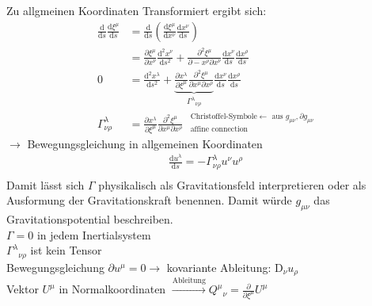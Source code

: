 \documentclass[a4paper]{article}
\begin{document}
Zu allgmeinen Koordinaten Transformiert ergibt sich:
\begin{align}
\frac{\mathrm{d}}{\mathrm{d}s}\frac{\mathrm{d}\xi^\mu}{\mathrm{d}s}&=
\frac{\mathrm{d}}{\mathrm{d}s}\left( \frac{\mathrm{d}\xi^\mu}{\mathrm{d}x^\nu}
\frac{\mathrm{d}x^\nu}{\mathrm{d}s} \right)\\
&=\frac{\partial \xi^\mu}{\partial x^\nu}
\frac{\mathrm{d}^2x^\nu}{\mathrm{d}s^2}+\frac{\partial^2 \xi^\mu}{\partial-
x^\rho \partial x^\nu}
\frac{\mathrm{d}x^\nu}{\mathrm{d}s} \frac{\mathrm{d}x^\rho}{\mathrm{d}s}\\
0&=\frac{\mathrm{d}^2x^\lambda}{\mathrm{d}s^2}+\underbrace{\frac{\partial
x^\lambda}{\partial \xi^\mu}\frac{\partial^2 \xi^\mu}{\partial x^\mu
\partial x^\rho}}_{\Gamma^\lambda{}_{\nu\rho}}
\frac{\mathrm{d}x^\nu}{\mathrm{d}s} \frac{\mathrm{d}x^\rho}{\mathrm{d}s}\\
\Gamma^\lambda_{\nu\rho}&=\frac{\partial
x^\lambda}{\partial \xi^\mu}\frac{\partial^2 \xi^\mu}{\partial x^\mu
\partial x^\rho} \ \ \ {}^{\text{Christoffel-Symbole}\leftarrow
\text{ aus } g_{\mu\nu},\partial g_{\mu\nu}}_{\text{affine connection}}
\end{align}
$\rightarrow$ Bewegungsgleichung in allgemeinen Koordinaten
\begin{align}
\frac{\mathrm{d} u^\lambda}{\mathrm{d}s}=-\Gamma^\lambda_{\nu\rho}u^\nu u^\rho\\
\end{align}
Damit lässt sich $\Gamma$ physikalisch als Gravitationsfeld interpretieren oder
als Ausformung der Gravitationskraft benennen. Damit würde $g_{\mu\nu}$ das
Gravitationspotential beschreiben.\\
$\Gamma=0$ in jedem Inertialsystem\\
$\Gamma^\lambda{}_{\nu\rho}$ ist kein Tensor\\
Bewegungsgleichung $\partial u^\mu=0 \longrightarrow$ kovariante Ableitung:
$\mathrm{D}_\nu u_\rho$\\
Vektor $U^\mu$ in Normalkoordinaten
$\overset{\text{Ableitung}}{\longrightarrow}
Q^\mu{}_\nu=\frac{\partial}{\partial \xi^\mu} U^\mu$\\
\end{document}
